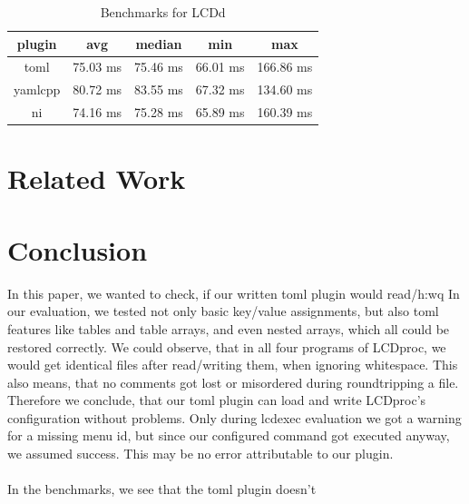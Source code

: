 \documentclass[draft,final]{vutinfth} %
\begin{document}
\FloatBarrier
\begin{table}[!ht]
	\centering
	\begin{tabular}{ccccc}
	\toprule
	plugin & avg & median & min & max \\
	\midrule
	toml 	& 75.03 ms	& 75.46 ms	& 66.01 ms	& 166.86 ms \\
	yamlcpp & 80.72 ms	& 83.55 ms	& 67.32 ms	& 134.60 ms \\
	ni		& 74.16 ms	& 75.28 ms	& 65.89 ms	& 160.39 ms \\
	\bottomrule
	\end{tabular}
	\caption{Benchmarks for LCDd}
	\label{tab:benchmarks}
\end{table}
\FloatBarrier

\chapter{Related Work}

\chapter{Conclusion}
In this paper, we wanted to check, if our written \acrshort{toml} plugin would read/h:wq
In our evaluation, we tested not only basic key/value assignments, but also \acrshort{toml} features like tables and table arrays, and even nested arrays, which all could be restored correctly.
We could observe, that in all four programs of LCDproc, we would get identical files after read/writing them, when ignoring whitespace.
This also means, that no comments got lost or misordered during roundtripping a file.
Therefore we conclude, that our \acrshort{toml} plugin can load and write LCDproc's configuration without problems.
Only during lcdexec evaluation we got a warning for a missing menu id, but since our configured command got executed anyway, we assumed success. This may be no error attributable to our plugin.
\\\\
In the benchmarks, we see that the \acrshort{toml} plugin doesn't 

\backmatter

\printindex

\printglossary[type=\acronymtype]

{}

\end{document}
